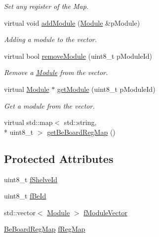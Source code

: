 \begin{DoxyCompactItemize}
\begin{DoxyCompactList}\small\item\em Set any register of the Map. \end{DoxyCompactList}\item 
virtual void \hyperlink{class_ph2___hw_description_1_1_be_board_a5242925c065165be9b407dabf889ac9a}{add\-Module} (\hyperlink{class_ph2___hw_description_1_1_module}{Module} \&p\-Module)
\begin{DoxyCompactList}\small\item\em Adding a module to the vector. \end{DoxyCompactList}\item 
virtual bool \hyperlink{class_ph2___hw_description_1_1_be_board_aba02e7319c8c41b569c583bfa2068215}{remove\-Module} (uint8\-\_\-t p\-Module\-Id)
\begin{DoxyCompactList}\small\item\em Remove a \hyperlink{class_ph2___hw_description_1_1_module}{Module} from the vector. \end{DoxyCompactList}\item 
virtual \hyperlink{class_ph2___hw_description_1_1_module}{Module} $\ast$ \hyperlink{class_ph2___hw_description_1_1_be_board_a71b8e3e970d554d7642bea8a9d21b037}{get\-Module} (uint8\-\_\-t p\-Module\-Id)
\begin{DoxyCompactList}\small\item\em Get a module from the vector. \end{DoxyCompactList}\item 
virtual std\-::map$<$ std\-::string, \\*
uint8\-\_\-t $>$ \hyperlink{class_ph2___hw_description_1_1_be_board_a91b95aaeb4d54df3ae4bae7cf2304912}{get\-Be\-Board\-Reg\-Map} ()
\end{DoxyCompactItemize}
\subsection*{Protected Attributes}
\begin{DoxyCompactItemize}
\item 
uint8\-\_\-t \hyperlink{class_ph2___hw_description_1_1_be_board_a8e45d863c0a596466a78fd3e16ef92d1}{f\-Shelve\-Id}
\item 
uint8\-\_\-t \hyperlink{class_ph2___hw_description_1_1_be_board_aabe1a515a23ff8813d4641293a8b4ba1}{f\-Be\-Id}
\item 
std\-::vector$<$ \hyperlink{class_ph2___hw_description_1_1_module}{Module} $>$ \hyperlink{class_ph2___hw_description_1_1_be_board_adcee78870a20c92fc8c060ff709a4baf}{f\-Module\-Vector}
\item 
\hyperlink{namespace_ph2___hw_description_a9b77ad2bbc2b144cdd4f1574b31eaa20}{Be\-Board\-Reg\-Map} \hyperlink{class_ph2___hw_description_1_1_be_board_a6db4850485715c0f23c97c3d621a781b}{f\-Reg\-Map}
\end{DoxyCompactItemize}
